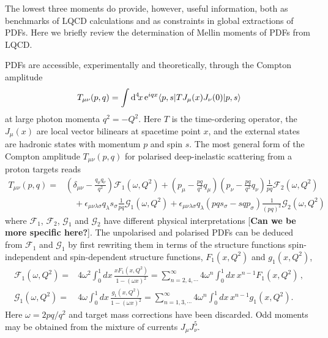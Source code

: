 The lowest three moments do provide, however, useful information, both as benchmarks of LQCD calculations and as constraints in global extractions of PDFs. Here we briefly review the determination of Mellin moments of PDFs from LQCD. 

PDFs are accessible, experimentally and theoretically, through the Compton amplitude
\begin{equation}
T_{\mu\nu}(p,q) = \int {\rm d}^4\!x\, {\rm e}^{iqx}  \langle p,s |T J_\mu(x) J_\nu(0)|p,s\rangle   
\end{equation}
at large photon momenta $q^2=-Q^2$. Here $T$ is the time-ordering operator, the $J_\mu(x)$ are local vector bilinears at spacetime point $x$, and the external states are hadronic states with momentum $p$ and spin $s$. The most general form of the Compton amplitude $T_{\mu\nu}(p,q)$ for polarised deep-inelastic scattering from a proton targets reads
\begin{align}
T_{\mu\nu}(p,q) = {} & \left(\delta_{\mu\nu}-\frac{q_\mu q_\nu}{q^2}\right) \mathcal{F}_1(\omega,Q^2) + \left(p_\mu-\frac{pq}{q^2}q_\mu\right) \left(p_\nu-\frac{pq}{q^2}q_\nu\right) \frac{1}{pq} \mathcal{F}_2(\omega,Q^2)\\ 
& {} \quad  + \epsilon_{\mu\nu\lambda\sigma}q_\lambda s_\sigma \frac{1}{pq}\mathcal{G}_1(\omega,Q^2) + \epsilon_{\mu\nu\lambda\sigma}q_\lambda \left(pq s_\sigma - sq p_\sigma\right) \frac{1}{(pq)^2}\mathcal{G}_2(\omega,Q^2)
\end{align}
where $\mathcal{F}_1$, $\mathcal{F}_2$, $\mathcal{G}_1$ and $\mathcal{G}_2$ have different physical interpretations [\textbf{Can we be more specific here?}]. The unpolarised and polarised PDFs can be deduced from $\mathcal{F}_1$ and $\mathcal{G}_1$ by first rewriting them in terms of the structure functions spin-independent and spin-dependent structure functions, $F_1(x,Q^2)$ and $g_1(x,Q^2)$,
\begin{align}
\mathcal{F}_1(\omega,Q^2) = {} & 4 \omega^2 \int_0^1 dx\,  \frac{xF_1(x,Q^2)}{1-(\omega x)^2} = \sum_{n=2,4,\cdots}^\infty 4\omega^n \int_0^1 dx\, x^{n-1} F_1(x,Q^2) \,, \\
\mathcal{G}_1(\omega,Q^2) = {} & 4 \omega \int_0^1 dx\, \frac{g_1(x,Q^2)}{1-(\omega x)^2} = \sum_{n=1,3,\cdots}^\infty 4\omega^n \int_0^1 dx\, x^{n-1} g_1(x,Q^2).
\end{align}
Here $\omega=2pq/q^2$ and target mass corrections have been discarded. Odd moments may be obtained from the mixture of currents $J_\mu J_\nu^5$.

